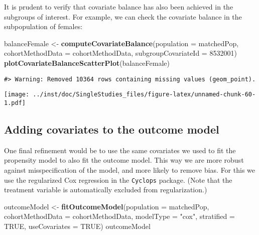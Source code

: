\documentclass[]{article}
\newenvironment{Shaded}{\begin{snugshade}}{\end{snugshade}}
\newcommand{\DataTypeTok}[1]{\textcolor[rgb]{0.13,0.29,0.53}{#1}}
\newcommand{\DecValTok}[1]{\textcolor[rgb]{0.00,0.00,0.81}{#1}}
\newcommand{\KeywordTok}[1]{\textcolor[rgb]{0.13,0.29,0.53}{\textbf{#1}}}
\newcommand{\NormalTok}[1]{#1}
\newcommand{\OtherTok}[1]{\textcolor[rgb]{0.56,0.35,0.01}{#1}}
\newcommand{\StringTok}[1]{\textcolor[rgb]{0.31,0.60,0.02}{#1}}
\begin{document}
It is prudent to verify that covariate balance has also been achieved in
the subgroups of interest. For example, we can check the covariate
balance in the subpopulation of females:

\begin{Shaded}
\begin{Highlighting}[]
\NormalTok{balanceFemale <-}\StringTok{ }\KeywordTok{computeCovariateBalance}\NormalTok{(}\DataTypeTok{population =}\NormalTok{ matchedPop, }
                                         \DataTypeTok{cohortMethodData =}\NormalTok{ cohortMethodData, }
                                         \DataTypeTok{subgroupCovariateId =} \DecValTok{8532001}\NormalTok{)}
\KeywordTok{plotCovariateBalanceScatterPlot}\NormalTok{(balanceFemale)}
\end{Highlighting}
\end{Shaded}

\begin{verbatim}
#> Warning: Removed 10364 rows containing missing values (geom_point).
\end{verbatim}

\texttt{[image: ../inst/doc/SingleStudies\_files/figure-latex/unnamed-chunk-60-1.pdf]}

\hypertarget{adding-covariates-to-the-outcome-model}{%
\subsection{Adding covariates to the outcome
model}\label{adding-covariates-to-the-outcome-model}}

One final refinement would be to use the same covariates we used to fit
the propensity model to also fit the outcome model. This way we are more
robust against misspecification of the model, and more likely to remove
bias. For this we use the regularized Cox regression in the
\texttt{Cyclops} package. (Note that the treatment variable is
automatically excluded from regularization.)

\begin{Shaded}
\begin{Highlighting}[]
\NormalTok{outcomeModel <-}\StringTok{ }\KeywordTok{fitOutcomeModel}\NormalTok{(}\DataTypeTok{population =}\NormalTok{ matchedPop,}
                                \DataTypeTok{cohortMethodData =}\NormalTok{ cohortMethodData,}
                                \DataTypeTok{modelType =} \StringTok{"cox"}\NormalTok{,}
                                \DataTypeTok{stratified =} \OtherTok{TRUE}\NormalTok{,}
                                \DataTypeTok{useCovariates =} \OtherTok{TRUE}\NormalTok{)}
\NormalTok{outcomeModel}
\end{Highlighting}
\end{Shaded}
\end{document}
